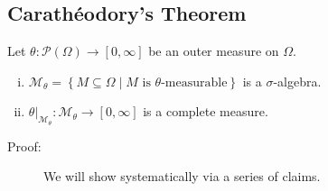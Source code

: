 \documentclass[9pt]{extarticle}
\begin{document}
  \subsection{Carathéodory's Theorem}%
  Let $\theta: \mathcal{P}(\Omega)\rightarrow [0,\infty]$ be an outer measure on $\Omega$.
  \begin{enumerate}[(i)]
    \item $\displaystyle \mathcal{M}_{\theta} = \left\{M\subseteq \Omega\mid M\text{ is $\theta$-measurable}\right\}$ is a $\sigma$-algebra.
    \item $\displaystyle \theta\vert_{\mathcal{M}_{\theta}}: \mathcal{M}_{\theta}\rightarrow [0,\infty]$ is a complete measure.
  \end{enumerate}
  \begin{description}
    \item[Proof:] We will show systematically via a series of claims.\\


\end{description}
\end{document}
